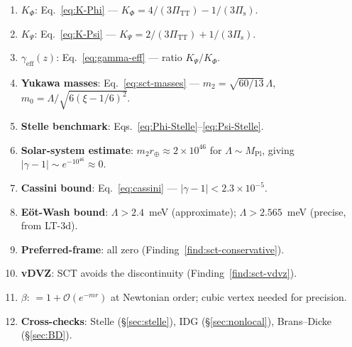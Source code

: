 \documentclass[11pt,a4paper]{article}
\theoremstyle{plain}
\theoremstyle{definition}
\theoremstyle{remark}
\begin{document}
\begin{enumerate}[nosep]
  \item \textbf{$K_\Phi$}: Eq.~\eqref{eq:K-Phi} ---
    $K_\Phi = 4/(3\Pi_{\mathrm{TT}}) - 1/(3\Pi_{\mathrm{s}})$.
  \item \textbf{$K_\Psi$}: Eq.~\eqref{eq:K-Psi} ---
    $K_\Psi = 2/(3\Pi_{\mathrm{TT}}) + 1/(3\Pi_{\mathrm{s}})$.
  \item \textbf{$\gamma_{\mathrm{eff}}(z)$}: Eq.~\eqref{eq:gamma-eff} ---
    ratio $K_\Psi/K_\Phi$.
  \item \textbf{Yukawa masses}: Eq.~\eqref{eq:sct-masses} ---
    $m_2 = \sqrt{60/13}\,\Lambda$,
    $m_0 = \Lambda/\sqrt{6(\xi-1/6)^2}$.
  \item \textbf{Stelle benchmark}: Eqs.~\eqref{eq:Phi-Stelle}--\eqref{eq:Psi-Stelle}.
  \item \textbf{Solar-system estimate}: $m_2 r_\oplus
    \approx 2 \times 10^{46}$ for $\Lambda \sim M_{\mathrm{Pl}}$,
    giving $|\gamma - 1| \sim e^{-10^{46}} \approx 0$.
  \item \textbf{Cassini bound}: Eq.~\eqref{eq:cassini} ---
    $|\gamma-1| < 2.3\times 10^{-5}$.
  \item \textbf{E\"ot-Wash bound}: $\Lambda > 2.4$~meV (approximate);
    $\Lambda > 2.565$~meV (precise, from LT-3d).
  \item \textbf{Preferred-frame}: all zero
    (Finding~\ref{find:sct-conservative}).
  \item \textbf{vDVZ}: SCT avoids the discontinuity
    (Finding~\ref{find:sct-vdvz}).
  \item \textbf{$\beta$}: $= 1 + \mathcal{O}(e^{-mr})$ at
    Newtonian order; cubic vertex needed for precision.
  \item \textbf{Cross-checks}: Stelle (\S\ref{sec:stelle}),
    IDG (\S\ref{sec:nonlocal}), Brans--Dicke (\S\ref{sec:BD}).
\end{enumerate}
\end{document}
